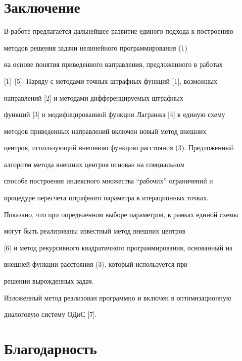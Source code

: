  


\section*{Заключение} 


 


В работе предлагается дальнейшее развитие единого подхода к построению 


методов решения задачи нелинейного программирования (1) 


на основе понятия приведенного направления, предложенного в работах 


[1]--[5]. Наряду с методами точных штрафных функций [1], возможных 


направлений [2] и методами дифференцируемых штрафных 


функций [3] и модифицированной функции Лагранжа [4] в единую схему 


методов приведенных направлений включен новый метод внешних 


центров, использующий внешнюю функцию расстояния (3). Предложенный 


алгоритм метода внешних центров основан на специальном 


способе построения индексного множества ``рабочих'' ограничений и 


процедуре пересчета штрафного параметра в итерационных точках. 


 


Показано, что при определенном выборе параметров, в рамках единой схемы 


могут быть реализованы известный метод внешних центров 


[6] и метод рекурсивного квадратичного программирования, основанный на 


внешней функции расстояния (3), который используется при 


решении вырожденных задач. 


 


Изложенный метод реализован программно и включен в оптимизационную 


диалоговую систему ОДиС [7]. 


 


\section*{Благодарность} 


